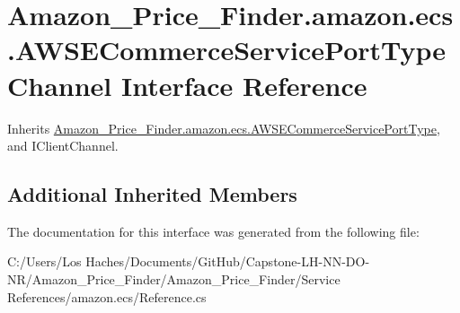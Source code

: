 \hypertarget{interface_amazon___price___finder_1_1amazon_1_1ecs_1_1_a_w_s_e_commerce_service_port_type_channel}{\section{Amazon\-\_\-\-Price\-\_\-\-Finder.\-amazon.\-ecs.\-A\-W\-S\-E\-Commerce\-Service\-Port\-Type\-Channel Interface Reference}
\label{interface_amazon___price___finder_1_1amazon_1_1ecs_1_1_a_w_s_e_commerce_service_port_type_channel}
}


Inherits \hyperlink{interface_amazon___price___finder_1_1amazon_1_1ecs_1_1_a_w_s_e_commerce_service_port_type}{Amazon\-\_\-\-Price\-\_\-\-Finder.\-amazon.\-ecs.\-A\-W\-S\-E\-Commerce\-Service\-Port\-Type}, and I\-Client\-Channel.

\subsection*{Additional Inherited Members}


The documentation for this interface was generated from the following file\-:\begin{DoxyCompactItemize}
\item 
C\-:/\-Users/\-Los Haches/\-Documents/\-Git\-Hub/\-Capstone-\/\-L\-H-\/\-N\-N-\/\-D\-O-\/\-N\-R/\-Amazon\-\_\-\-Price\-\_\-\-Finder/\-Amazon\-\_\-\-Price\-\_\-\-Finder/\-Service References/amazon.\-ecs/Reference.\-cs\end{DoxyCompactItemize}
